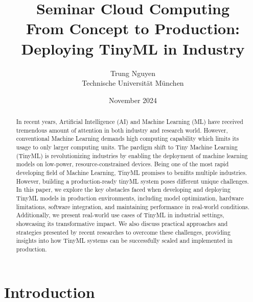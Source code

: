 \documentclass[twocolumn]{article}
\author{Trung Nguyen\\ Technische Universit\"at M\"unchen}
\title{Seminar Cloud Computing \\
       {\bf From Concept to Production: Deploying TinyML in Industry}
}
\date{November 2024}
\begin{document}
\maketitle

\begin{abstract}
In recent years, Artificial Intelligence (AI) and Machine Learning (ML) have received tremendous amount of attention in both industry and research world. However, conventional Machine Learning demands high computing capability which limits its usage to only larger computing units. The pardigm shift to Tiny Machine Learning (TinyML) is revolutionizing industries by enabling the deployment of machine learning models on low-power, resource-constrained devices. Being one of the most rapid developing field of Machine Learning, TinyML promises to benifits multiple industries. However, building a production-ready tinyML system poses different unique challenges. In this paper, we explore the key obstacles faced when developing and deploying TinyML models in production environments, including model optimization, hardware limitations, software integration, and maintaining performance in real-world conditions. Additionally, we present real-world use cases of TinyML in industrial settings, showcasing its transformative impact. We also discuss practical approaches and strategies presented by recent researches \cite{ren_tinyol_2021} to overcome these challenges, providing insights into how TinyML systems can be successfully scaled and implemented in production.
\end{abstract}

\section{Introduction}
\label{introduction}
\end{document}
